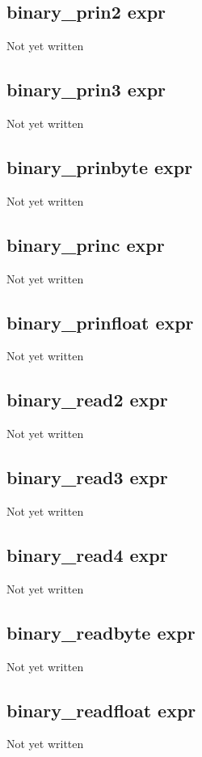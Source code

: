 \documentclass[a4paper,11pt]{article}
\begin{document}
{\subsection{\ttfamily binary\_prin2 expr}
   Not yet written

\subsection{\ttfamily binary\_prin3 expr}
   Not yet written

\subsection{\ttfamily binary\_prinbyte expr}
   Not yet written

\subsection{\ttfamily binary\_princ expr}
   Not yet written

\subsection{\ttfamily binary\_prinfloat expr}
   Not yet written

\subsection{\ttfamily binary\_read2 expr}
   Not yet written

\subsection{\ttfamily binary\_read3 expr}
   Not yet written

\subsection{\ttfamily binary\_read4 expr}
   Not yet written

\subsection{\ttfamily binary\_readbyte expr}
   Not yet written

\subsection{\ttfamily binary\_readfloat expr}
   Not yet written

}
\end{document}

